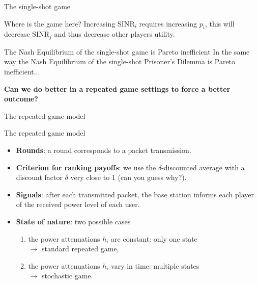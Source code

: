 \begin{frame}{The single-shot game}
    \begin{block}{Where is the game here?}
        Increasing $\text{SINR}_i$ requires increasing $p_i$, this will decrease $\text{SINR}_j$ and
        thus decrease other players utility.
    \end{block}
    \pause 
    \vspace{0.5cm}
    \begin{alertblock}{The Nash Equilibrium of the single-shot game is Pareto inefficient}
        In the same way the Nash Equilibrium of the single-shot Prisoner's Dilemma is
        Pareto inefficient...
    \end{alertblock}
    \pause
    \vspace{0.5cm}
    \textbf{{\color{green}Can we do better in a repeated game settings to force a better outcome?}}
\end{frame}

\begin{frame}{The repeated game model}
    \begin{exampleblock}{The repeated game model}
        \begin{itemize}
            \pause
            \item \textbf{Rounds}: a round corresponds to a packet transmission.
            \pause
            \item \textbf{Criterion for ranking payoffs}: we use the $\delta$-discounted average with a
            discount factor $\delta$ very close to 1 (can you guess why?).
            \pause
            \item \textbf{Signals}: after each transmitted packet, the base station informs each player
            of the received power level of each user.
            \pause
            \item \textbf{State of nature}: two possible cases
            \begin{enumerate}
                \pause
                \item the power attenuations $h_i$ are constant: only one state\\
                $\to$ standard repeated game,
                \pause
                \item the power attenuations $h_i$ vary in time: multiple states\\
                $\to$ stochastic game.
            \end{enumerate}
        \end{itemize}
    \end{exampleblock}
\end{frame}

